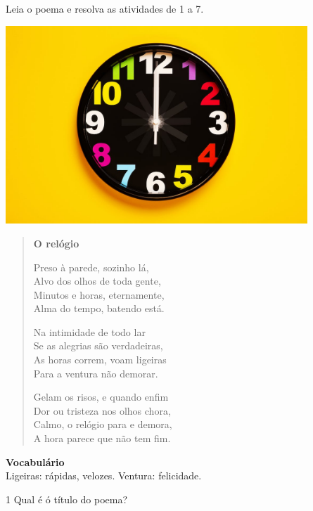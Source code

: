 
Leia o poema e resolva as atividades de 1 a 7.


\includegraphics[width=4.46875in,height=2.93485in]{./media/image16.jpeg}

\begin{verse}
\textbf{O relógio}

Preso à parede, sozinho lá,\\
Alvo dos olhos de toda gente,\\
Minutos e horas, eternamente,\\
Alma do tempo, batendo está.

Na intimidade de todo lar\\
Se as alegrias são verdadeiras,\\
As horas correm, voam ligeiras\\
Para a ventura não demorar.

Gelam os risos, e quando enfim\\
Dor ou tristeza nos olhos chora,\\
Calmo, o relógio para e demora,\\
A hora parece que não tem fim.
\end{verse}


\textbf{Vocabulário}\\
Ligeiras: rápidas, velozes.
Ventura: felicidade.

\num{1} Qual é ó título do poema?

